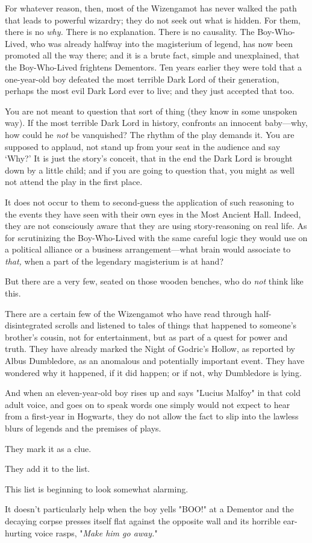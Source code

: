 For whatever reason, then, most of the Wizengamot has never walked the path
that leads to powerful wizardry; they do not seek out what is hidden. For them,
there is no \emph{why.} There is no explanation. There is no causality. The
Boy-Who-Lived, who was already halfway into the magisterium of legend, has now
been promoted all the way there; and it is a brute fact, simple and
unexplained, that the Boy-Who-Lived frightens Dementors. Ten years earlier they
were told that a one-year-old boy defeated the most terrible Dark Lord of their
generation, perhaps the most evil Dark Lord ever to live; and they just
accepted that too.

You are not meant to question that sort of thing (they know in some unspoken
way). If the most terrible Dark Lord in history, confronts an innocent
baby---why, how could he \emph{not} be vanquished? The rhythm of the play
demands it. You are supposed to applaud, not stand up from your seat in the
audience and say `Why?' It is just the story's conceit, that in the end the
Dark Lord is brought down by a little child; and if you are going to question
that, you might as well not attend the play in the first place.

It does not occur to them to second-guess the application of such reasoning to
the events they have seen with their own eyes in the Most Ancient Hall. Indeed,
they are not consciously aware that they are using story-reasoning on real
life. As for scrutinizing the Boy-Who-Lived with the same careful logic they
would use on a political alliance or a business arrangement---what brain would
associate to \emph{that,} when a part of the legendary magisterium is at hand?

But there are a very few, seated on those wooden benches, who do \emph{not}
think like this.

There are a certain few of the Wizengamot who have read through
half-disintegrated scrolls and listened to tales of things that happened to
someone's brother's cousin, not for entertainment, but as part of a quest for
power and truth. They have already marked the Night of Godric's Hollow, as
reported by Albus Dumbledore, as an anomalous and potentially important event.
They have wondered why it happened, if it did happen; or if not, why Dumbledore
is lying.

And when an eleven-year-old boy rises up and says "Lucius Malfoy" in that cold
adult voice, and goes on to speak words one simply would not expect to hear
from a first-year in Hogwarts, they do not allow the fact to slip into the
lawless blurs of legends and the premises of plays.

They mark it as a clue.

They add it to the list.

This list is beginning to look somewhat alarming.

It doesn't particularly help when the boy yells "BOO!" at a Dementor and the
decaying corpse presses itself flat against the opposite wall and its horrible
ear-hurting voice rasps, "\emph{Make him go away.}"
